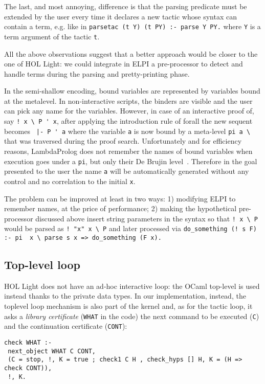 \documentclass[preprint]{sigplanconf}
\begin{document}
The last, and most annoying, difference is that the parsing predicate must be extended by the user every time it declares a new tactic whose syntax can contain a term, e.g. like in \texttt{parsetac (t Y) (t PY) :- parse Y PY.} where \verb+Y+ is a term argument of the tactic \verb+t+.

All the above observations suggest that a better approach would be closer to the one of HOL Light: we could integrate in ELPI a pre-processor to detect and handle terms during the parsing and pretty-printing phase.

In the semi-shallow encoding, bound variables are represented by variables bound at the metalevel. In non-interactive scripts, the binders are visible and the user can pick any name for the variables. However, in case of an interactive proof of, say \verb+! x \ P ' x+, after applying the introduction rule of forall the new sequent becomes \verb+ |- P ' a+ where the variable \verb+a+ is now bound by a meta-level \verb+pi a \ + that was traversed during the proof search. Unfortunately and for efficiency reasons, LambdaProlog does not remember the names of bound variables when execution goes under a \verb+pi+, but only their De Brujin level~\cite{debrujn1}. Therefore in the goal presented to the user the name \verb+a+ will be automatically generated without any control and no correlation to the initial \verb+x+.

The problem can be improved at least in two ways: 1) modifying ELPI to remember names, at the price of performance; 2) making the hypothetical pre-processor discussed above insert string parameters in the syntax so that \verb+! x \ P+ would be parsed as \verb+! "x" x \ P+ and later processed via \verb+do_something (! s F) :- pi  x \ parse s x => do_something (F x).+

\subsection{Top-level loop}

HOL Light does not have an ad-hoc interactive loop: the OCaml top-level is used instead thanks to the private data types. In our implementation, instead, the toplevel loop mechanism is also part of the kernel and, as for the tactic loop, it asks a \emph{library certificate} (\verb+WHAT+ in the code) the next command to be executed
(\verb+C+) and the continuation certificate (\verb+CONT+):

\begin{verbatim}
check WHAT :-
 next_object WHAT C CONT,
 (C = stop, !, K = true ; check1 C H , check_hyps [] H, K = (H => check CONT)),
 !, K.
\end{verbatim}
\end{document}
